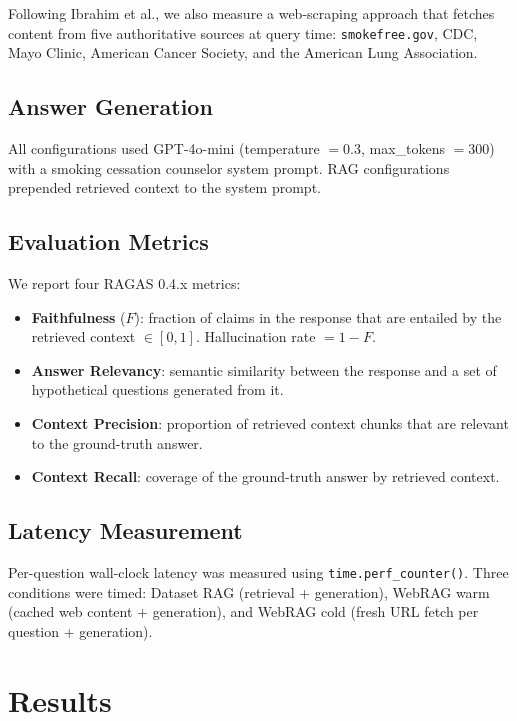 \documentclass[11pt,a4paper]{article}
\begin{document}
Following Ibrahim et al., we also measure a web-scraping approach that
fetches content from five authoritative sources at query time:
\texttt{smokefree.gov}, CDC, Mayo Clinic, American Cancer Society,
and the American Lung Association.

\subsection{Answer Generation}

All configurations used GPT-4o-mini (temperature $= 0.3$, max\_tokens $= 300$)
with a smoking cessation counselor system prompt.
RAG configurations prepended retrieved context to the system prompt.

\subsection{Evaluation Metrics}

We report four RAGAS 0.4.x metrics:
\begin{itemize}
  \item \textbf{Faithfulness} ($F$): fraction of claims in the response
        that are entailed by the retrieved context $\in [0, 1]$.
        Hallucination rate $= 1 - F$.
  \item \textbf{Answer Relevancy}: semantic similarity between the response
        and a set of hypothetical questions generated from it.
  \item \textbf{Context Precision}: proportion of retrieved context chunks
        that are relevant to the ground-truth answer.
  \item \textbf{Context Recall}: coverage of the ground-truth answer by
        retrieved context.
\end{itemize}

\subsection{Latency Measurement}

Per-question wall-clock latency was measured using \texttt{time.perf\_counter()}.
Three conditions were timed: Dataset RAG (retrieval + generation),
WebRAG warm (cached web content + generation), and WebRAG cold
(fresh URL fetch per question + generation).

\section{Results}
\end{document}
